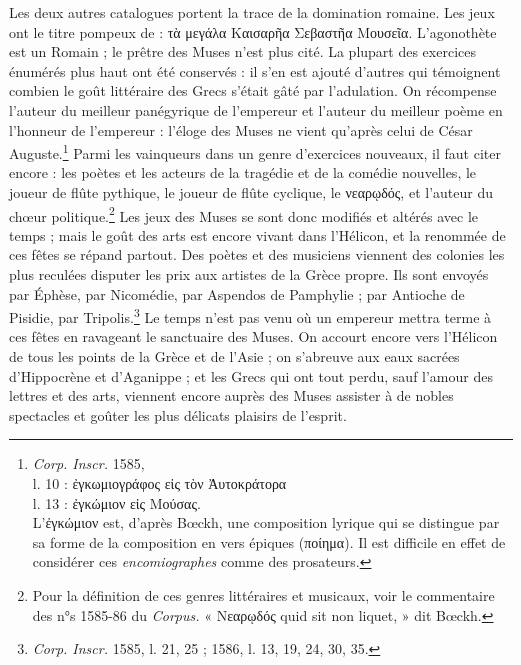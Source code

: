 \documentclass[a4paper, 11pt, oneside, polutonikogreek, french]{article}
\begin{document}
Les deux autres catalogues portent la trace de la domination romaine. Les jeux ont le titre pompeux de : τὰ μεγάλα Καισαρῆα Σεβαστῆα Μουσεῖα. L'agonothète est un Romain ; le prêtre des Muses n'est plus cité. La plupart des exercices énumérés plus haut ont été conservés : il s'en est ajouté d'autres qui témoignent combien le goût littéraire des Grecs s'était gâté par l'adulation. On récompense l'auteur du meilleur panégyrique de l'empereur et l'auteur du meilleur poème en l'honneur de l'empereur : l'éloge des Muses ne vient qu'après celui de César Auguste.\footnote{\emph{Corp. Inscr.} 1585,\\\hspace*{5mm}l. 10 : ἐγκωμιογράφος εἰς τὸν Ἀυτοκράτορα\\\hspace*{5mm}l. 13 : ἐγκώμιον εἰς Μούσας.\\\hspace*{5mm}L'ἐγκώμιον est, d'après Bœckh, une composition lyrique qui se distingue par sa forme de la composition en vers épiques (ποίημα). Il est difficile en effet de considérer ces \emph{encomiographes} comme des prosateurs.} Parmi les vainqueurs dans un genre d'exercices nouveaux, il faut citer encore : les poètes et les acteurs de la tragédie et de la comédie nouvelles, le joueur de flûte pythique, le joueur de flûte cyclique, le νεαρῳδός, et l'auteur du chœur politique.\footnote{Pour la définition de ces genres littéraires et musicaux, voir le commentaire des n°s 1585-86 du \emph{Corpus.} « Νεαρῳδός quid sit non liquet, » dit Bœckh.} Les jeux des Muses se sont donc modifiés et altérés avec le temps ; mais le goût des arts est encore vivant dans l'Hélicon, et la renommée de ces fêtes se répand partout. Des poètes et des musiciens viennent des colonies les plus reculées disputer les prix aux artistes de la Grèce propre. Ils sont envoyés par Éphèse, par Nicomédie, par Aspendos de Pamphylie ; par Antioche de Pisidie, par Tripolis.\footnote{\emph{Corp. Inscr.} 1585, l. 21, 25 ; 1586, l. 13, 19, 24, 30, 35.} Le temps n'est pas venu où un empereur mettra terme à ces fêtes en ravageant le sanctuaire des Muses. On accourt encore vers l'Hélicon de tous les points de la Grèce et de l'Asie ; on s'abreuve aux eaux sacrées d'Hippocrène et d'Aganippe ; et les Grecs qui ont tout perdu, sauf l'amour des lettres et des arts, viennent encore auprès des Muses assister à de nobles spectacles et goûter les plus délicats plaisirs de l'esprit.
\end{document}
